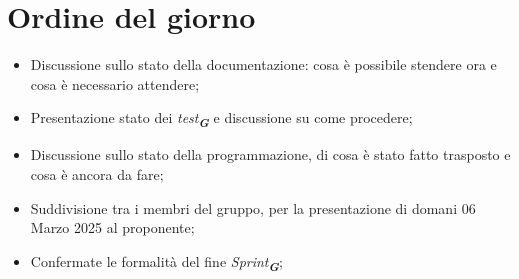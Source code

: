 

\section{Ordine del giorno}

\begin{itemize}
    \item Discussione sullo stato della documentazione: cosa è possibile stendere ora e cosa è necessario attendere;
    \item Presentazione stato dei \emph{test}\textsubscript{\textit{\textbf{G}}} e discussione su come procedere;
    \item Discussione sullo stato della programmazione, di cosa è stato fatto trasposto e cosa è ancora da fare;
    \item Suddivisione tra i membri del gruppo, per la presentazione di domani 06 Marzo 2025 al proponente;
    \item Confermate le formalità del fine \emph{Sprint}\textsubscript{\textit{\textbf{G}}};
\end{itemize}